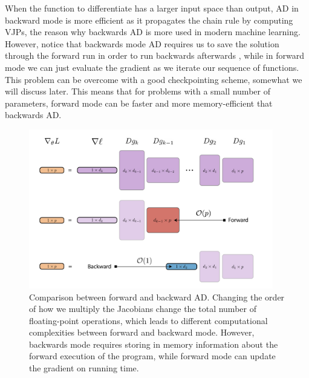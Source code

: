 When the function to differentiate has a larger input space than output, AD in backward mode is more efficient as it propagates the chain rule by computing VJPs, the reason why backwards AD is more used in modern machine learning.
However, notice that backwards mode AD requires us to save the solution through the forward run in order to run backwards afterwards \cite{Bennett_1973}, while in forward mode we can just evaluate the gradient as we iterate our sequence of functions. 
This problem can be overcome with a good checkpointing scheme, somewhat we will discuss later. 
This means that for problems with a small number of parameters, forward mode can be faster and more memory-efficient that backwards AD.

\begin{figure}
    \centering
    \includegraphics[width=0.95\textwidth]{figures/VJP-JVP.png}
    \caption{Comparison between forward and backward AD. Changing the order of how we multiply the Jacobians change the total number of floating-point operations, which leads to different computational complexities between forward and backward mode. However, backwards mode requires storing in memory information about the forward execution of the program, while forward mode can update the gradient on running time.}
    \label{fig:vjp-jvp}
\end{figure}
